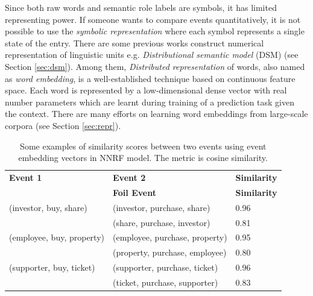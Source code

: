 \documentclass[a4paper]{article}
\begin{document}
Since both raw words and semantic role labels are symbols, it has limited representing power. If someone wants to compare events quantitatively, it is not possible to use the \textit{symbolic representation} where each symbol represents a single state of the entry. There are some previous works construct numerical representation of linguistic units e.g. \textit{Distributional semantic model} (DSM) (see Section \ref{sec:dsm}). Among them, \textit{Distributed representation} of words, also named as \textit{word embedding}, is a well-established technique based on continuous feature space. Each word is represented by a low-dimensional dense vector with real number parameters which are learnt during training of a prediction task given the context. There are many efforts on learning word embeddings from large-scale corpora (see Section \ref{sec:repr}). 


\begin{table}[t]
\centering
\begin{tabular}{l|ll}
\textbf{Event 1}    &   \textbf{Event 2}    &   \textbf{Similarity} \\
                    &   \textbf{Foil Event} &   \textbf{Similarity} \\  \hline
(investor, buy, share)      &   (investor, purchase, share)     &   0.96    \\
                            &   (share, purchase, investor)     &   0.81    \\    \hline
(employee, buy, property)   &   (employee, purchase, property)  &   0.95    \\
                            &   (property, purchase, employee)  &   0.80    \\    \hline
(supporter, buy, ticket)    &   (supporter, purchase, ticket)   &   0.96    \\
                            &   (ticket, purchase, supporter)   &   0.83    \\
\end{tabular}
\caption{\label{tab:eventsim} Some examples of similarity scores between two events using event embedding vectors in NNRF model. The metric is cosine similarity. }
\end{table}
\end{document}

